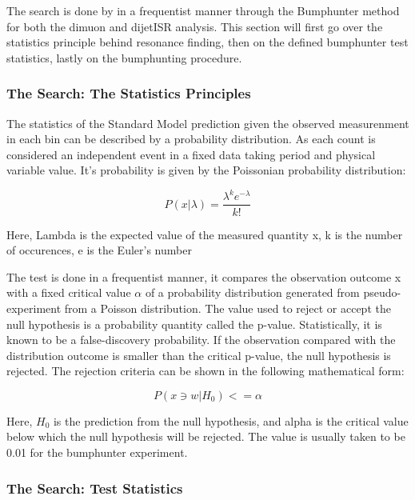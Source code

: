 The search is done by in a frequentist manner through the Bumphunter method~\cite{choudalakis2011hypothesis} for both the dimuon and dijetISR analysis. This section will first go over the statistics principle behind resonance finding, then on the defined bumphunter test statistics, lastly on the bumphunting procedure. 

\subsubsection{The Search: The Statistics Principles}
The statistics of the Standard Model prediction given the observed measurenment in each bin can be described by a probability distribution. As each count is considered an independent event in a fixed data taking period and physical variable value. It's probability is given by the Poissonian probability distribution:

\begin{equation}
 P(x|\lambda) = \frac{\lambda^{k}e^{-\lambda}}{k!} 
 \label{eq:Poissonian}
\end{equation}

Here, Lambda is the expected value of the measured quantity x, k is the number of occurences, e is the Euler's number  

    The test is done in a frequentist manner, it compares the observation outcome x with a fixed critical value $\alpha$ of a probability distribution generated from pseudo-experiment from a Poisson distribution. The value used to reject or accept the null hypothesis is a probability quantity called the p-value. Statistically, it is known to be a false-discovery probability. 
    If the observation compared with the distribution outcome is smaller than the critical p-value, the null hypothesis is rejected. The rejection criteria can be shown in the following mathematical form:

\begin{equation}
    P(x \ni w|H_0)<= \alpha 
    \label{eq:test}
\end{equation}


Here, $H_0$ is the prediction from the null hypothesis, and alpha is the critical value below which the null hypothesis will be rejected. The value is usually taken to be 0.01 for the bumphunter experiment. 

\subsubsection{The Search: Test Statistics}
\label{teststatistics}

